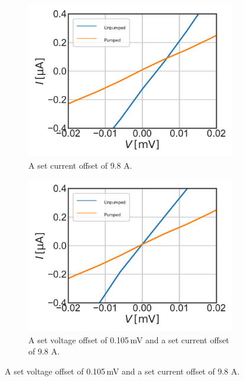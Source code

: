 \documentclass[]{article}
\begin{document}
\begin{figure}
	\centering              
	\begin{subfigure}[t]{0.49\textwidth}
		\centering
		\includegraphics[width=\linewidth]{./../Mixer_Unit_Test/2020_01_16_IVOffsetFixedMask_9.8uA/Unpumped_Pumped_Offset_Zoom.pdf}
		\caption{A set current offset of 9.8 \textmu A.}
	\end{subfigure}
	\begin{subfigure}[t]{0.49\textwidth}
		\centering
		\includegraphics[width=\linewidth]{./../Mixer_Unit_Test/2020_01_16_IVOffsetFixedMask_0.105mV9.8uA/Unpumped_Pumped_Offset_Zoom.pdf}
		\caption{A set voltage offset of 0.105\,mV and a set current offset of 9.8 \textmu A.}
	\end{subfigure}

\end{figure}
\end{document}
